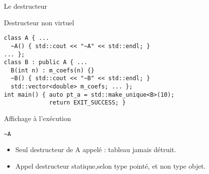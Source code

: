 \documentclass[compress,10pt,aspectratio=169]{beamer}
\begin{document}
  \begin{frame}[fragile]{Le destructeur}
  \scriptsize\vspace*{-5mm}
  \begin{minipage}{\textwidth}
  \begin{block}{\small Destructeur non virtuel}
  \vspace*{-3mm}
  \begin{minipage}{0.48\textwidth}
  \begin{verbatim}
class A { ...
  ~A() { std::cout << "~A" << std::endl; }
... };
class B : public A { ...
  B(int n) : m_coefs(n) {}
  ~B() { std::cout << "~B" << std::endl; }
  std::vector<double> m_coefs; ... };
int main() { auto pt_a = std::make_unique<B>(10);
             return EXIT_SUCCESS; }
\end{verbatim}
\end{minipage}\hfill
\begin{minipage}{0.48\textwidth}
  \begin{block}{\small Affichage à l'exécution}
\begin{tcolorbox}[colback=black,coltext=white]
\begin{verbatim}
~A
\end{verbatim}
\end{tcolorbox}
\begin{itemize}
  \item Seul destructeur de A appelé : tableau  jamais détruit. 
  \item Appel destructeur statique,selon type pointé, et non type objet.
\end{itemize}
  \end{block}
  \end{minipage}
\end{block}
\end{minipage}


\end{frame}
\end{document}

